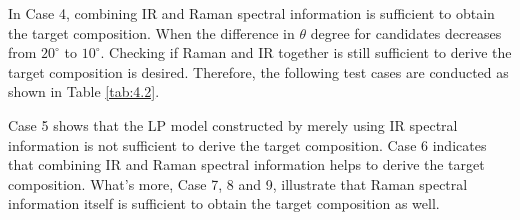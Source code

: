 In Case 4, combining IR and Raman spectral information is sufficient to obtain the target composition. When the difference in $\theta$ degree for candidates decreases from $20^{\circ}$ to $10^{\circ}$. Checking if Raman and IR together is still sufficient to derive the target composition is desired. Therefore, the following test cases are conducted as shown in Table \ref{tab:4.2}. \\

\begin{table} \tiny 
{}
\caption{Test case 5 to 9 setting for Met candidates}
\label{tab:4.2}
\end{table}	

Case 5 shows that the LP model constructed by merely using IR spectral information is not sufficient to derive the target composition. Case 6 indicates that combining IR and Raman spectral information helps to derive the target composition. What's more, Case 7, 8 and 9, illustrate that Raman spectral information itself is sufficient to obtain the target composition as well. \\

